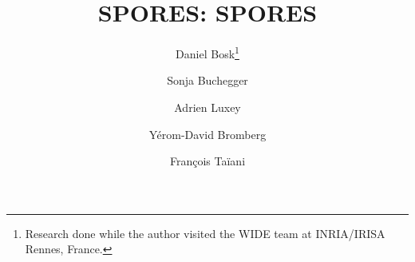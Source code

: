 \documentclass{article}
\begin{document}
\title{%
  \acs*{SPORES}: \acl*{SPORES}%
}

\author[1]{Daniel Bosk\thanks{%
  Research done while the author visited the WIDE team at INRIA/IRISA Rennes, 
  France.
}}
\author[1]{Sonja Buchegger}
\author[2]{Adrien Luxey}
\author[2]{Yérom-David Bromberg}
\author[2]{François Taïani}


\begin{abstract}
  
\end{abstract}


\end{document}
